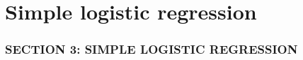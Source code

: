 \documentclass[12pt, 
hyperref={colorlinks=true, linkcolor=blue, urlcolor=cyan}]{beamer}
\begin{document}
\section{Simple logistic regression}
\begin{frame}
\frametitle{SECTION 3: SIMPLE LOGISTIC REGRESSION}


\end{frame}

\end{document}
